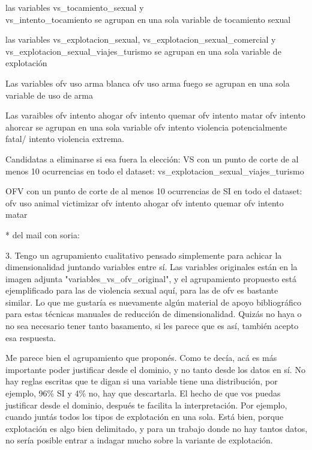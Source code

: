 \documentclass[10pt, spanish]{article}
\begin{document}
las variables vs\_tocamiento\_sexual y \\ vs\_intento\_tocamiento se agrupan en una sola variable de tocamiento sexual



las variables vs\_explotacion\_sexual,  vs\_explotacion\_sexual\_comercial y vs\_explotacion\_sexual\_viajes\_turismo se agrupan en una sola variable de explotación


Las variables ofv uso arma blanca ofv uso arma fuego se agrupan en una sola variable de uso de arma

Las varaibles ofv intento ahogar ofv intento quemar 
ofv intento matar ofv intento ahorcar se agrupan en una sola variable ofv intento violencia potencialmente fatal/ intento violencia extrema.

Candidatas a eliminarse si esa fuera la elección: VS con un punto de corte de al menos 10 ocurrencias en todo el dataset: vs\_explotacion\_sexual\_viajes\_turismo



OFV con un punto de corte de al menos 10 ocurrencias de SI en todo el dataset: ofv uso animal victimizar
ofv intento ahogar
ofv intento quemar 
ofv intento matar


* del mail con soria:

3. Tengo un agrupamiento cualitativo pensado simplemente para achicar la dimensionalidad juntando variables entre sí. Las variables originales están en la imagen adjunta "variables\_vs\_ofv\_original", y el agrupamiento propuesto está ejemplificado para las de violencia sexual aquí, para las de ofv es bastante similar. Lo que me gustaría es nuevamente algún material de apoyo bibliográfico para estas técnicas manuales de reducción de dimensionalidad. Quizás no haya o no sea necesario tener tanto basamento, si les parece que es así, también acepto esa respuesta.

Me parece bien el agrupamiento que proponés. Como te decía, acá es más importante poder justificar desde el dominio, y no tanto desde los datos en sí. No hay reglas escritas que te digan si una variable tiene una distribución, por ejemplo, 96\% SI y 4\% no, hay que descartarla.
El hecho de que vos puedas justificar desde el dominio, después te facilita la interpretación. Por ejemplo, cuando juntás todos los tipos de explotación en una sola. Está bien, porque explotación es algo bien delimitado, y para un trabajo donde no hay tantos datos, no sería posible entrar a indagar mucho sobre la variante de explotación.
\end{document}
